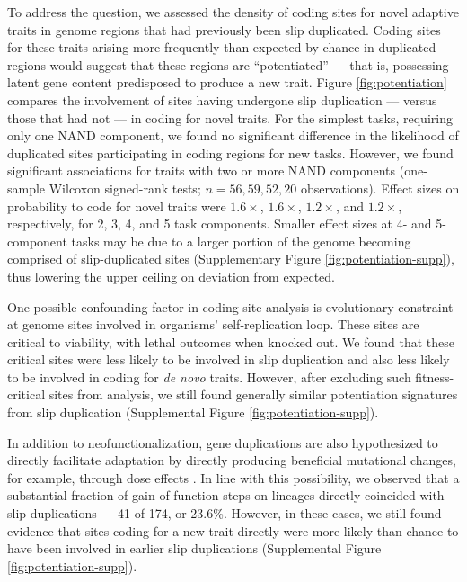 To address the question, we assessed the density of coding sites for novel adaptive traits in genome regions that had previously been slip duplicated.
Coding sites for these traits arising more frequently than expected by chance in duplicated regions would suggest that these regions are ``potentiated'' --- that is, possessing latent gene content predisposed to produce a new trait.
Figure \ref{fig:potentiation} compares the involvement of sites having undergone slip duplication --- versus those that had not --- in coding for novel traits.
For the simplest tasks, requiring only one NAND component, we found no significant difference in the likelihood of duplicated sites participating in coding regions for new tasks.
However, we found significant associations for traits with two or more NAND components (one-sample Wilcoxon signed-rank tests; $n=56,59,52,20$ observations).
Effect sizes on probability to code for novel traits were $1.6\times$, $1.6\times$, $1.2\times$, and $1.2\times$, respectively, for 2, 3, 4, and 5 task components.
Smaller effect sizes at 4- and 5-component tasks may be due to a larger portion of the genome becoming comprised of slip-duplicated sites (Supplementary Figure \ref{fig:potentiation-supp}), thus lowering the upper ceiling on deviation from expected.

One possible confounding factor in coding site analysis is evolutionary constraint at genome sites involved in organisms' self-replication loop.
These sites are critical to viability, with lethal outcomes when knocked out.
We found that these critical sites were less likely to be involved in slip duplication and also less likely to be involved in coding for \textit{de novo} traits.
However, after excluding such fitness-critical sites from analysis, we still found generally similar potentiation signatures from slip duplication (Supplemental Figure \ref{fig:potentiation-supp}).

In addition to neofunctionalization, gene duplications are also hypothesized to directly facilitate adaptation by directly producing beneficial mutational changes, for example, through dose effects \citep{kondrashov2012gene}.
In line with this possibility, we observed that a substantial fraction of gain-of-function steps on lineages directly coincided with slip duplications --- 41 of 174, or 23.6\%.
However, in these cases, we still found evidence that sites coding for a new trait directly were more likely than chance to have been involved in earlier slip duplications (Supplemental Figure \ref{fig:potentiation-supp}).

